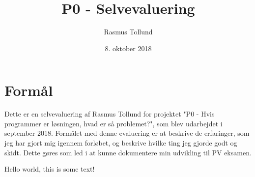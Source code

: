 \documentclass[10pt,a4paper]{article}
\author{Rasmus Tollund}
\title{P0 - Selvevaluering}
\date{8. oktober 2018}
\begin{document}
\maketitle

\section*{Formål}
Dette er en selvevaluering af Rasmus Tollund for projektet "P0 - Hvis programmer er løsningen, hvad er så problemet?", som blev udarbejdet i september 2018. Formålet med denne evaluering er at beskrive de erfaringer, som jeg har gjort mig igennem forløbet, og beskrive hvilke ting jeg gjorde godt og skidt. Dette gøres som led i at kunne dokumentere min udvikling til PV eksamen.

Hello world, this is some text!
\end{document}
